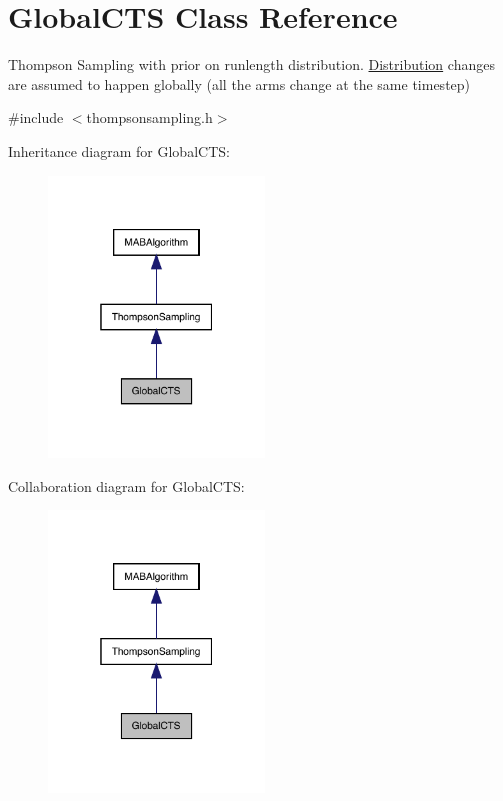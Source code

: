 \hypertarget{class_global_c_t_s}{}\section{Global\+C\+TS Class Reference}
\label{class_global_c_t_s}


Thompson Sampling with prior on runlength distribution. \mbox{\hyperlink{class_distribution}{Distribution}} changes are assumed to happen globally (all the arms change at the same timestep)  




{\ttfamily \#include $<$thompsonsampling.\+h$>$}



Inheritance diagram for Global\+C\+TS\+:
\nopagebreak
\begin{figure}[H]
\begin{center}
\leavevmode
\includegraphics[width=163pt]{class_global_c_t_s__inherit__graph}
\end{center}
\end{figure}


Collaboration diagram for Global\+C\+TS\+:
\nopagebreak
\begin{figure}[H]
\begin{center}
\leavevmode
\includegraphics[width=163pt]{class_global_c_t_s__coll__graph}
\end{center}
\end{figure}
